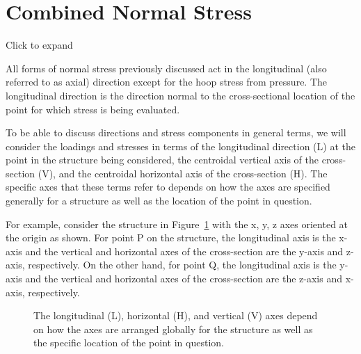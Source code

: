 \documentclass[
  letterpaper,
  DIV=11,
  numbers=noendperiod]{scrreprt}
\theoremstyle{definition}
\theoremstyle{remark}
\begin{document}
\section{Combined Normal Stress}\label{sec-14.1}

Click to expand

All forms of normal stress previously discussed act in the longitudinal
(also referred to as axial) direction except for the hoop stress from
pressure. The longitudinal direction is the direction normal to the
cross-sectional location of the point for which stress is being
evaluated.

To be able to discuss directions and stress components in general terms,
we will consider the loadings and stresses in terms of the longitudinal
direction (L) at the point in the structure being considered, the
centroidal vertical axis of the cross-section (V), and the centroidal
horizontal axis of the cross-section (H). The specific axes that these
terms refer to depends on how the axes are specified generally for a
structure as well as the location of the point in question.

For example, consider the structure in Figure~\ref{fig-14.1} with the x,
y, z axes oriented at the origin as shown. For point P on the structure,
the longitudinal axis is the x-axis and the vertical and horizontal axes
of the cross-section are the y-axis and z-axis, respectively. On the
other hand, for point Q, the longitudinal axis is the y-axis and the
vertical and horizontal axes of the cross-section are the z-axis and
x-axis, respectively.

\begin{figure}


\caption{\label{fig-14.1}The longitudinal (L), horizontal (H), and
vertical (V) axes depend on how the axes are arranged globally for the
structure as well as the specific location of the point in question.}

\end{figure}%
\end{document}
